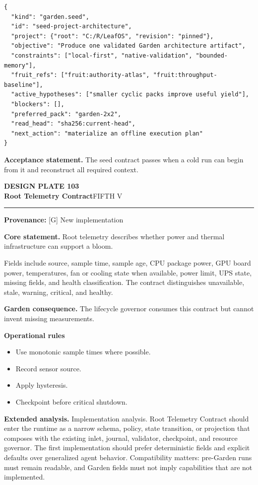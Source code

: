 \documentclass[10pt,letterpaper,oneside]{article}
\newcommand{\prov}[1]{\textcolor{gardenBlue}{\sffamily\footnotesize\textbf{Provenance:} #1}}
\newcommand{\platetitle}[3]{%
  \begin{minipage}[t][0.54in][t]{\textwidth}
  {\sffamily\bfseries\color{gardenDeep}\fontsize{9}{10}\selectfont DESIGN PLATE #1}\\[-1pt]
  {\sffamily\bfseries\color{gardenInk}\fontsize{16.5}{18}\selectfont #2}\hfill{\sffamily\color{gardenGreen}\large #3}
  \end{minipage}\vspace{-2pt}\hrule\vspace{5pt}}
\begin{document}
\begin{lstlisting}
{
  "kind": "garden.seed",
  "id": "seed-project-architecture",
  "project": {"root": "C:/R/LeafOS", "revision": "pinned"},
  "objective": "Produce one validated Garden architecture artifact",
  "constraints": ["local-first", "native-validation", "bounded-memory"],
  "fruit_refs": ["fruit:authority-atlas", "fruit:throughput-baseline"],
  "active_hypotheses": ["smaller cyclic packs improve useful yield"],
  "blockers": [],
  "preferred_pack": "garden-2x2",
  "read_head": "sha256:current-head",
  "next_action": "materialize an offline execution plan"
}
\end{lstlisting}
\begin{acceptbox}
\textbf{Acceptance statement.} The seed contract passes when a cold run can begin from it and reconstruct all required context.
\end{acceptbox}
\newpage
\platetitle{103}{Root Telemetry Contract}{FIFTH V}
\prov{[G] New implementation}
\fontsize{8.85}{10.45}\selectfont
\begin{corebox}
\textbf{Core statement.} Root telemetry describes whether power and thermal infrastructure can support a bloom.
\end{corebox}
Fields include source, sample time, sample age, CPU package power, GPU board power, temperatures, fan or cooling state when available, power limit, UPS state, missing fields, and health classification. The contract distinguishes unavailable, stale, warning, critical, and healthy.

\textbf{Garden consequence.} The lifecycle governor consumes this contract but cannot invent missing measurements.

\textbf{Operational rules}
\begin{itemize}
\item Use monotonic sample times where possible.
\item Record sensor source.
\item Apply hysteresis.
\item Checkpoint before critical shutdown.
\end{itemize}
\textbf{Extended analysis.} Implementation analysis. Root Telemetry Contract should enter the runtime as a narrow schema, policy, state transition, or projection that composes with the existing inlet, journal, validator, checkpoint, and resource governor. The first implementation should prefer deterministic fields and explicit defaults over generalized agent behavior. Compatibility matters: pre-Garden runs must remain readable, and Garden fields must not imply capabilities that are not implemented.
\end{document}
